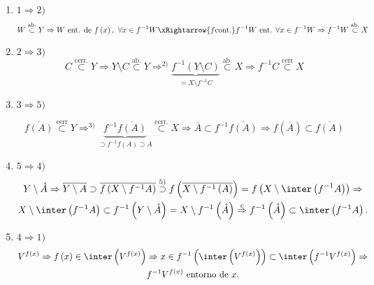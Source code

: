 \begin{demo}
\begin{enumerate}
    \item $1 \Rightarrow 2)$
    \[
        W \stackrel{\text{ab.}}{\subset}  Y \Rightarrow W \text{ ent. de } f\left( x \right),\ \forall x \in f^{-1}W \xRightarrow{f \text{cont.}} f^{-1} W \text{ ent. } \forall x \in f^{-1}W \Rightarrow f^{-1} W \stackrel{\text{ab.}}{\subset}  X 
    \]
    \item $2 \Rightarrow 3)$
    \[
        C \stackrel{\text{cerr.}}{\subset}  Y \Rightarrow Y \setminus C \stackrel{\text{ab.}}{\subset} Y \Rightarrow^{2)} \underbrace{f^{-1}\left( Y\setminus C \right)}_{= X \setminus f^{-1}C} \stackrel{\text{ab.}}{\subset} X \Rightarrow f^{-1}C \stackrel{\text{cerr}}{\subset} X 
    \]
    \item $3 \Rightarrow 5)$

    \[
        \overline{f\left( A \right)} \stackrel{\text{cerr}}{\subset} Y \Rightarrow^{3)} \underbrace{f^{-1}\overline{f\left( A \right)}}_{\supset f^{-1}f\left( A \right) \supset A} \stackrel{\text{cerr.}}{\subset} X \Rightarrow \overline{A} \subset f^{-1}\overline{f\left( A \right)} \Rightarrow f\left( \overline{A} \right) \subset \overline{f\left( A \right)} 
    \]
    \item $5 \Rightarrow 4)$
    \begin{gather*}
        Y \setminus \mathring{A}\Rightarrow \overline{Y\setminus A} \supset \overline{f\left( X \setminus f^{-1}A \right)} \stackrel{5)}{\supset} f\left( \overline{X \setminus f^{-1}\left( A \right)} \right) = f\left( X \setminus \inter\left( f^{-1}A \right) \right) \Rightarrow\\
        X \setminus \inter\left( f^{-1}A \right) \subset f^{-1}\left( Y\setminus \mathring{A} \right) = X \setminus f^{-1}\left( \mathring{A} \right)\stackrel{c}{\Rightarrow}  f^{-1}\left( \mathring{A} \right) \subset \inter\left( f^{-1}A \right) 
    .\end{gather*}

    \item $4 \Rightarrow 1)$
    \begin{gather*}
        V^{f\left( x \right)} \Rightarrow f\left( x \right) \in \inter\left( V^{f\left( x \right)} \right) \Rightarrow x \in f^{-1}\left( \inter\left( V^{f\left( x \right)} \right) \right) \subset \inter\left( f^{-1}V^{f\left( x \right)} \right) \Rightarrow \\
        f^{-1}V^{f\left( x \right) } \text{ entorno de } x.
    \end{gather*}
\end{enumerate}
\end{demo}

